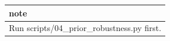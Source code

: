 \begin{tabular}{l}
\toprule
note \\
\midrule
Run scripts/04\_prior\_robustness.py first. \\
\bottomrule
\end{tabular}

